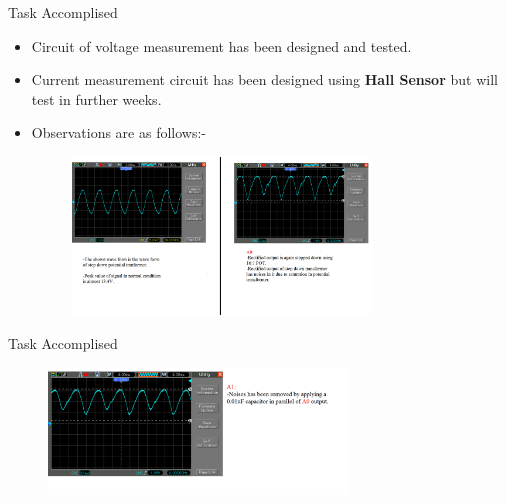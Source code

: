 \documentclass[10pt, a4paper]{beamer}
\begin{document}
\begin{frame}{Task Accomplised}
	\begin{itemize}
		\item Circuit of voltage measurement has been designed and tested. 
		\item Current measurement circuit has been designed using \textbf{Hall Sensor} but will test in further weeks.
		\item Observations are as follows:-
		\vspace{0.3cm}
		\begin{figure}[h]
			\hspace{-1.25cm}
			\includegraphics[width=300px]{voltage_circuit}
		\end{figure}
	\end{itemize}
\end{frame}
\begin{frame}{Task Accomplised}
		\begin{figure}[h]
			\includegraphics[width=300px]{voltage1}
		\end{figure}
\end{frame}
\end{document}
